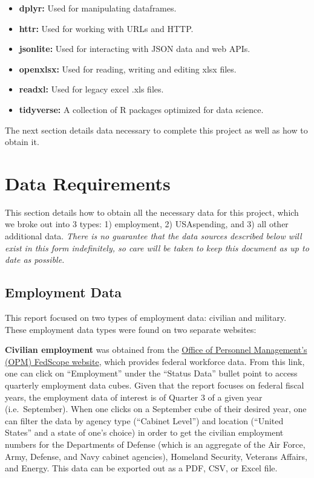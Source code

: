 \documentclass[
]{book}
\providecommand{\tightlist}{%
  \setlength{\itemsep}{0pt}\setlength{\parskip}{0pt}}
\begin{document}
\begin{itemize}
\tightlist
\item
  \textbf{dplyr:} Used for manipulating dataframes. \citep{dplyr1}
\item
  \textbf{httr:} Used for working with URLs and HTTP. \citep{httr2}
\item
  \textbf{jsonlite:} Used for interacting with JSON data and web APIs. \citep{json3}
\item
  \textbf{openxlsx:} Used for reading, writing and editing xlsx files. \citep{openxlsx4}
\item
  \textbf{readxl:} Used for legacy excel .xls files. \citep{readxl5}
\item
  \textbf{tidyverse:} A collection of R packages optimized for data science. \citep{tidyverse6}
\end{itemize}

The next section details data necessary to complete this project as well as how to obtain it.

\hypertarget{data-requirements}{%
\chapter{Data Requirements}\label{data-requirements}}

This section details how to obtain all the necessary data for this project, which we broke out into 3 types: 1) employment, 2) USAspending, and 3) all other additional data. \emph{There is no guarantee that the data sources described below will exist in this form indefinitely, so care will be taken to keep this document as up to date as possible.}

\hypertarget{employment-data}{%
\section{Employment Data}\label{employment-data}}

This report focused on two types of employment data: civilian and military. These employment data types were found on two separate websites:

\textbf{Civilian employment} was obtained from the \href{https://www.fedscope.opm.gov/}{Office of Personnel Management's (OPM) FedScope website}, which provides federal workforce data. From this link, one can click on ``Employment'' under the ``Status Data'' bullet point to access quarterly employment data cubes. Given that the report focuses on federal fiscal years, the employment data of interest is of Quarter 3 of a given year (i.e.~September). When one clicks on a September cube of their desired year, one can filter the data by agency type (``Cabinet Level'') and location (``United States'' and a state of one's choice) in order to get the civilian employment numbers for the Departments of Defense (which is an aggregate of the Air Force, Army, Defense, and Navy cabinet agencies), Homeland Security, Veterans Affairs, and Energy. This data can be exported out as a PDF, CSV, or Excel file.
\end{document}

